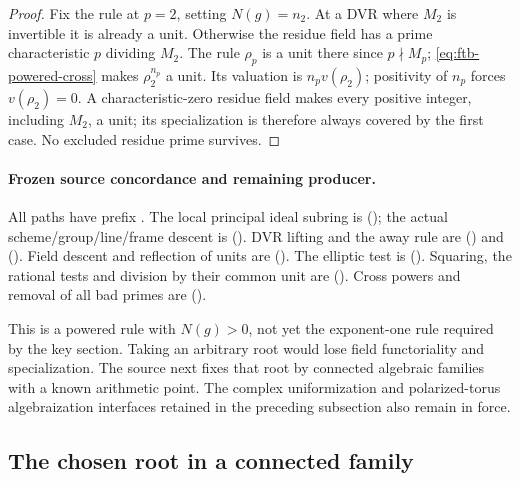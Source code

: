 \begin{proof}
Fix the rule at \(p=2\), setting \(N(g)=n_2\).
At a DVR where \(M_2\) is invertible it is already a unit.
Otherwise the residue field has a prime characteristic \(p\)
dividing \(M_2\).  The rule \(\rho_p\) is a unit there since
\(p\nmid M_p\); \eqref{eq:ftb-powered-cross} makes
\(\rho_2^{n_p}\) a unit.  Its valuation is
\(n_pv(\rho_2)\); positivity of \(n_p\) forces
\(v(\rho_2)=0\).
A characteristic-zero residue field makes every positive integer,
including \(M_2\), a unit; its specialization is therefore always
covered by the first case.  No excluded residue prime survives.
\end{proof}

\paragraph{Frozen source concordance and remaining producer.}
All paths have prefix
.
The local principal ideal subring is
();
the actual scheme/group/line/frame descent is
().
DVR lifting and the away rule are
()
and 
().
Field descent and reflection of units are
().
The elliptic test is
().
Squaring, the rational tests and division by their common unit are
().
Cross powers and removal of all bad primes are
().

This is a powered rule with \(N(g)>0\), not yet the exponent-one
rule required by the key section.  Taking an arbitrary root would
lose field functoriality and specialization.  The source next fixes
that root by connected algebraic families with a known arithmetic
point.  The complex uniformization and polarized-torus
algebraization interfaces retained in the preceding subsection
also remain in force.


\subsection{The chosen root in a connected family}
\label{sec:ftb-key-connected-root}

